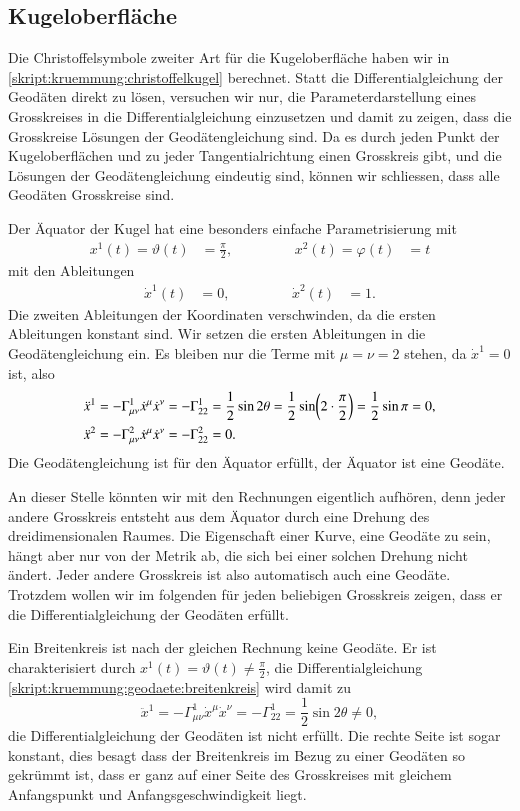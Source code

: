 \subsection{Kugeloberfläche}
Die Christoffelsymbole zweiter Art für die Kugeloberfläche haben wir
in \eqref{skript:kruemmung:christoffelkugel} berechnet.
Statt die Differentialgleichung der Geodäten direkt zu lösen, versuchen
wir nur, die Parameterdarstellung eines Grosskreises in die
Differentialgleichung einzusetzen und damit zu zeigen, dass die
Grosskreise Lösungen der Geodätengleichung sind.
Da es durch jeden Punkt der Kugeloberflächen und zu jeder Tangentialrichtung
einen Grosskreis gibt, und die Lösungen der Geodätengleichung eindeutig
sind, können wir schliessen, dass alle Geodäten Grosskreise sind.

Der Äquator der Kugel hat eine besonders einfache Parametrisierung mit
\[
\begin{aligned}
x^1(t)=\vartheta(t)&=\frac{\pi}2,
&\qquad&&
x^2(t)=\varphi(t)&=t
\end{aligned}
\]
mit den Ableitungen
\[
\begin{aligned}
\dot x^1(t)&=0,
&\qquad&&
\dot x^2(t)&=1.
\end{aligned}
\]
Die zweiten Ableitungen der Koordinaten verschwinden, da die ersten
Ableitungen konstant sind.
Wir setzen die ersten Ableitungen in die Geodätengleichung ein.
Es bleiben nur die Terme mit $\mu=\nu=2$ stehen, da $\dot x^1=0$ ist,
also
\begin{align}
\ddot x^1
&=
-\Gamma_{\mu\nu}^1\dot x^\mu\dot x^\nu
=
-\Gamma_{22}^1=\frac12\sin2\theta
=
\frac12\sin\biggl( 2\cdot\frac{\pi}2\biggr)
=
\frac12\sin\pi
=
0,
\label{skript:kruemmung:geodaete:breitenkreis}
\\
\ddot x^2
&=
-\Gamma_{\mu\nu}^2\dot x^\mu\dot x^\nu
=
-\Gamma_{22}^2=0.
\notag
\end{align}
Die Geodätengleichung ist für den Äquator erfüllt, der Äquator ist
eine Geodäte.

An dieser Stelle könnten wir mit den Rechnungen eigentlich aufhören, 
denn jeder andere Grosskreis entsteht aus dem Äquator durch eine
Drehung des dreidimensionalen Raumes.
Die Eigenschaft einer Kurve, eine Geodäte zu sein, hängt aber nur von
der Metrik ab, die sich bei einer solchen Drehung nicht ändert.
Jeder andere Grosskreis ist also automatisch auch eine Geodäte.
Trotzdem wollen wir im folgenden für jeden beliebigen Grosskreis
zeigen, dass er die Differentialgleichung der Geodäten erfüllt.

Ein Breitenkreis ist nach der gleichen Rechnung keine Geodäte.
Er ist charakterisiert durch $x^1(t)=\vartheta(t)\ne\frac{\pi}2$,
die Differentialgleichung
\eqref{skript:kruemmung:geodaete:breitenkreis}
wird damit zu
\[
\ddot x^1
=
-\Gamma_{\mu\nu}^1\dot x^\mu\dot x^\nu
=
-\Gamma_{22}^1
=
\frac12\sin2\theta
\ne
0,
\]
die Differentialgleichung der Geodäten ist nicht erfüllt.
Die rechte Seite ist sogar konstant, dies besagt dass der Breitenkreis
im Bezug zu einer Geodäten so gekrümmt ist, dass er ganz
auf einer Seite des Grosskreises mit gleichem Anfangspunkt und
Anfangsgeschwindigkeit liegt.

